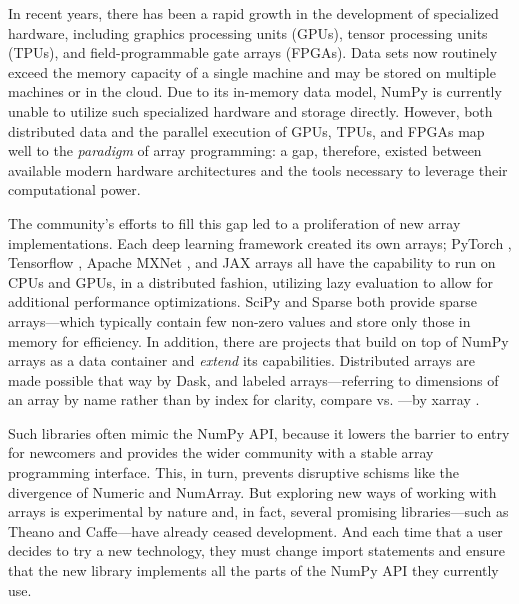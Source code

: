 


In recent years, there has been a rapid growth in the development of
specialized hardware, including graphics processing
units (GPUs), tensor processing units (TPUs), and field-programmable
gate arrays (FPGAs).  Data sets now routinely exceed the memory capacity of a single machine and may be stored on multiple machines or in
the cloud.  Due to its in-memory data model, NumPy is currently unable to
utilize such specialized hardware and storage directly.  However, both
distributed data and the parallel execution of GPUs, TPUs, and FPGAs map well
to the \emph{paradigm} of array programming: a gap, therefore, existed between
available modern hardware architectures and the tools necessary to
leverage their computational power.

The community's efforts to fill this gap led to a
proliferation of new array implementations. Each deep learning framework created
its own arrays; PyTorch \cite{NEURIPS2019_9015},
Tensorflow \cite{abadi2016tensorflow}, Apache MXNet \cite{chen2015mxnet},
and JAX arrays all have the
capability to run on CPUs and GPUs, in a distributed fashion, utilizing lazy evaluation
to allow for additional performance optimizations.  SciPy and Sparse both
provide sparse arrays---which typically contain few non-zero values and store
only those in memory for efficiency.
In addition, there are projects that build on top of NumPy arrays as a data
container and \textit{extend} its capabilities.  Distributed arrays are
made possible that way by Dask, and labeled arrays---referring to dimensions of
an array by name rather than by index for clarity, compare  vs.
---by xarray \cite{hoyer2017xarray}.

Such libraries often mimic the NumPy API, because it lowers the
barrier to entry for newcomers and provides the wider community with a
stable array programming interface. This, in turn, prevents disruptive
schisms like the divergence of Numeric and NumArray.
But exploring new ways of working with arrays is experimental by nature
and, in fact, several promising libraries---such as Theano and Caffe---have
already ceased development. And each time that a user
decides to try a new technology, they must
change import statements and ensure that the new library implements
all the parts of the NumPy API they currently use.

